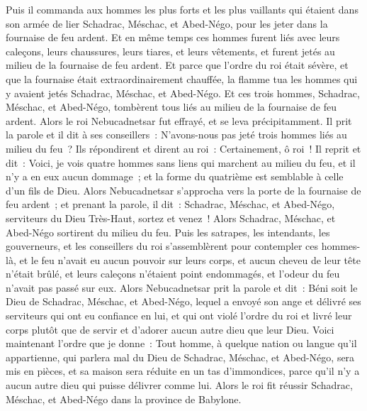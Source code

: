 \begin{multicols}{2}
Puis il commanda aux hommes les plus forts et les plus vaillants qui étaient dans son armée de lier Schadrac, Méschac, et Abed-Négo, pour les jeter dans la fournaise de feu ardent.
Et en même temps ces hommes furent liés avec leurs caleçons, leurs chaussures, leurs tiares, et leurs vêtements, et furent jetés au milieu de la fournaise de feu ardent.
Et parce que l'ordre du roi était sévère, et que la fournaise était extraordinairement chauffée, la flamme tua les hommes qui y avaient jetés Schadrac, Méschac, et Abed-Négo.
Et ces trois hommes, Schadrac, Méschac, et Abed-Négo, tombèrent tous liés au milieu de la fournaise de feu ardent.
Alors le roi Nebucadnetsar fut effrayé, et se leva précipitamment. Il prit la parole et il dit à ses conseillers~: N'avons-nous pas jeté trois hommes liés au milieu du feu~? Ils répondirent et dirent au roi~: Certainement, ô roi~!
Il reprit et dit~: Voici, je vois quatre hommes sans liens qui marchent au milieu du feu, et il n'y a en eux aucun dommage~; et la forme du quatrième est semblable à celle d'un fils de Dieu.
Alors Nebucadnetsar s'approcha vers la porte de la fournaise de feu ardent~; et prenant la parole, il dit~: Schadrac, Méschac, et Abed-Négo, serviteurs du Dieu Très-Haut, sortez et venez~! Alors Schadrac, Méschac, et Abed-Négo sortirent du milieu du feu.
Puis les satrapes, les intendants, les gouverneurs, et les conseillers du roi s'assemblèrent pour contempler ces hommes-là, et le feu n'avait eu aucun pouvoir sur leurs corps, et aucun cheveu de leur tête n'était brûlé, et leurs caleçons n'étaient point endommagés, et l'odeur du feu n'avait pas passé sur eux.
Alors Nebucadnetsar prit la parole et dit~: Béni soit le Dieu de Schadrac, Méschac, et Abed-Négo, lequel a envoyé son ange et délivré ses serviteurs qui ont eu confiance en lui, et qui ont violé l'ordre du roi et livré leur corps plutôt que de servir et d'adorer aucun autre dieu que leur Dieu.
Voici maintenant l'ordre que je donne~: Tout homme, à quelque nation ou langue qu'il appartienne, qui parlera mal du Dieu de Schadrac, Méschac, et Abed-Négo, sera mis en pièces, et sa maison sera réduite en un tas d'immondices, parce qu'il n'y a aucun autre dieu qui puisse délivrer comme lui.
Alors le roi fit réussir Schadrac, Méschac, et Abed-Négo dans la province de Babylone.

\end{multicols}
